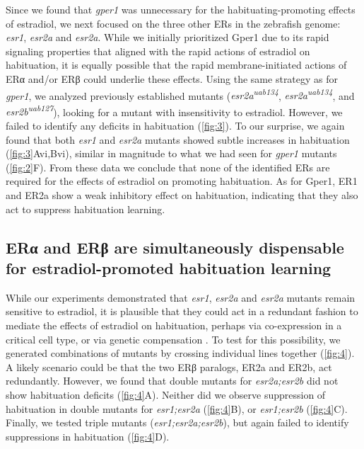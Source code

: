 \documentclass[9.5pt,lineno]{RandlettLab_elife}
\begin{document}
{Since we found that \emph{gper1} was unnecessary for the habituating-promoting effects of estradiol, we next focused on the three other ERs in the zebrafish genome: \emph{esr1}, \emph{esr2a} and \emph{esr2a}. 
While we initially prioritized Gper1 due to its rapid signaling properties that aligned with the rapid actions of estradiol on habituation, it is equally possible that the rapid membrane-initiated actions of ERα and/or ERβ could underlie these effects.
Using the same strategy as for \emph{gper1}, we analyzed previously established mutants (\emph{esr2a\textsuperscript{uab134}}, \emph{esr2a\textsuperscript{uab134}}, and \emph{esr2b\textsuperscript{uab127}}), looking for a mutant with insensitivity to estradiol. 
However, we failed to identify any deficits in habituation (\autoref{fig:3}).
To our surprise, we again found that both \emph{esr1} and \emph{esr2a} mutants showed subtle increases in habituation (\autoref{fig:3}Avi,Bvi), similar in magnitude to what we had seen for \emph{gper1} mutants (\autoref{fig:2}F). 
From these data we conclude that none of the identified ERs are required for the effects of estradiol on promoting habituation. As for Gper1, ER1 and ER2a show a weak inhibitory effect on habituation, indicating that they also act to suppress habituation learning.

\subsection{ERα and ERβ are simultaneously dispensable for estradiol-promoted habituation learning}


While our experiments demonstrated that \emph{esr1}, \emph{esr2a} and \emph{esr2a} mutants remain sensitive to estradiol, it is plausible that they could act in a redundant fashion to mediate the effects of estradiol on habituation, perhaps via co-expression in a critical cell type, or via genetic compensation \citep{El-Brolosy2019-uq}. 
To test for this possibility, we generated combinations of mutants by crossing individual lines together (\autoref{fig:4}). 
A likely scenario could be that the two ERβ paralogs, ER2a and ER2b, act redundantly. 
However, we found that double mutants for \emph{esr2a;esr2b} did not show habituation deficits (\autoref{fig:4}A).
Neither did we observe suppression of habituation in double mutants for \emph{esr1;esr2a} (\autoref{fig:4}B), or \emph{esr1;esr2b} (\autoref{fig:4}C). 
Finally, we tested triple mutants (\emph{esr1;esr2a;esr2b}), but again failed to identify suppressions in habituation (\autoref{fig:4}D).

}
\end{document}
